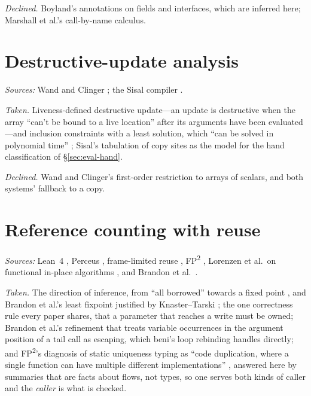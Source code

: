 \emph{Declined.} Boyland's annotations on fields and interfaces, which are inferred here; Marshall et
al.'s call-by-name calculus.

\section{Destructive-update analysis}

\emph{Sources:} Wand and Clinger \citep{wand2001set}; the Sisal compiler \citep{cann1990sisal}.

\emph{Taken.} Liveness-defined destructive update---an update is destructive when the array ``can't be
bound to a live location'' after its arguments have been evaluated---and inclusion constraints with a
least solution, which ``can be solved in polynomial time'' \citep{wand2001set}; Sisal's tabulation of
copy sites as the model for the hand classification of \S\ref{sec:eval-hand}.

\emph{Declined.} Wand and Clinger's first-order restriction to arrays of scalars, and both systems'
fallback to a copy.

\section{Reference counting with reuse}

\emph{Sources:} Lean~4 \citep{ullrich2019beans,demoura2021lean4}, Perceus \citep{reinking2021perceus},
frame-limited reuse \citep{lorenzen2022frame}, FP\textsuperscript{2} \citep{lorenzen2023fp2},
Lorenzen et al.\ on functional in-place algorithms \citep{lorenzen2024bst}, and Brandon et al.\
\citep{brandon2026borrows}.

\emph{Taken.} The direction of inference, from ``all borrowed'' towards a fixed point
\citep[\S5.2]{ullrich2019beans}, and Brandon et al.'s least fixpoint justified by Knaster--Tarski
\citep[\S4.4]{brandon2026borrows}; the one correctness rule every paper shares, that a parameter that
reaches a write must be owned; Brandon et al.'s refinement that treats variable occurrences in the
argument position of a tail call as escaping, which beni's loop rebinding handles directly; and
FP\textsuperscript{2}'s diagnosis of static uniqueness typing as ``code duplication, where a single
function can have multiple different implementations'' \citep[\S1.4.1]{lorenzen2023fp2}, answered here
by summaries that are facts about flows, not types, so one \code{reverse} serves both kinds of caller
and the \emph{caller} is what is checked.

